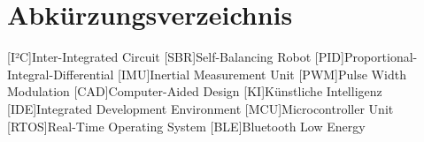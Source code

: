\documentclass[fontsize=12pt,
parskip=half,	%
department=FakM,  %
logostyle=flat,
twoside, %
DIV=15,BCOR=10mm, %
]{OTHRreprt}
\begin{document}
    	\thispagestyle{empty}
	\label{Sec:Abkuerzungen}
	\chapter*{Abkürzungsverzeichnis}
	\begin{acronym}[OTH R]
	 [I²C]{Inter-Integrated Circuit}
	 [SBR]{Self-Balancing Robot}
	 [PID]{Proportional-Integral-Differential}
	 [IMU]{Inertial Measurement Unit}
	 [PWM]{Pulse Width Modulation}
	 [CAD]{Computer-Aided Design}
	 [KI]{Künstliche Intelligenz}
	 [IDE]{Integrated Development Environment}
	 [MCU]{Microcontroller Unit}
	 [RTOS]{Real-Time Operating System}
	 [BLE]{Bluetooth Low Energy}
	\end{acronym}


  	

	


	\cleardoublepage
	\thispagestyle{empty}

	\cleardoublepage
\end{document}
